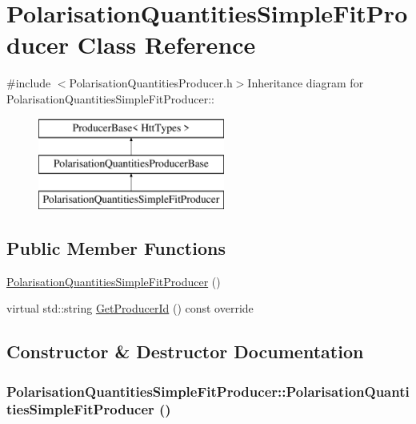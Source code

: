 \hypertarget{classPolarisationQuantitiesSimpleFitProducer}{
\section{PolarisationQuantitiesSimpleFitProducer Class Reference}
\label{classPolarisationQuantitiesSimpleFitProducer}
}


{\ttfamily \#include $<$PolarisationQuantitiesProducer.h$>$}Inheritance diagram for PolarisationQuantitiesSimpleFitProducer::\begin{figure}[H]
\begin{center}
\leavevmode
\includegraphics[height=3cm]{classPolarisationQuantitiesSimpleFitProducer}
\end{center}
\end{figure}
\subsection*{Public Member Functions}
\begin{DoxyCompactItemize}
\item 
\hyperlink{classPolarisationQuantitiesSimpleFitProducer_a8e1a369ce6aff08e80e35812055b0966}{PolarisationQuantitiesSimpleFitProducer} ()
\item 
virtual std::string \hyperlink{classPolarisationQuantitiesSimpleFitProducer_abb2cbe3680b39d8a4f3052dcd4088997}{GetProducerId} () const override
\end{DoxyCompactItemize}


\subsection{Constructor \& Destructor Documentation}
\hypertarget{classPolarisationQuantitiesSimpleFitProducer_a8e1a369ce6aff08e80e35812055b0966}{
\subsubsection[{PolarisationQuantitiesSimpleFitProducer}]{\setlength{\rightskip}{0pt plus 5cm}PolarisationQuantitiesSimpleFitProducer::PolarisationQuantitiesSimpleFitProducer ()}}
\label{classPolarisationQuantitiesSimpleFitProducer_a8e1a369ce6aff08e80e35812055b0966}


